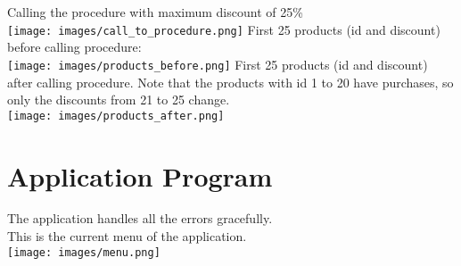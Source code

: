 \documentclass[a4paper,11pt]{article}
\begin{document}
Calling the procedure with maximum discount of 25\%\\
\texttt{[image: images/call\_to\_procedure.png]}
First 25 products (id and discount) before calling procedure:\\
\texttt{[image: images/products\_before.png]}
First 25 products (id and discount) after calling procedure. Note that the products with id 1 to 20 have purchases, so only the discounts from 21 to 25 change. \\
\texttt{[image: images/products\_after.png]}

\section*{Application Program}
The application handles all the errors gracefully.\\
This is the current menu of the application.\\
\texttt{[image: images/menu.png]}
\end{document}

